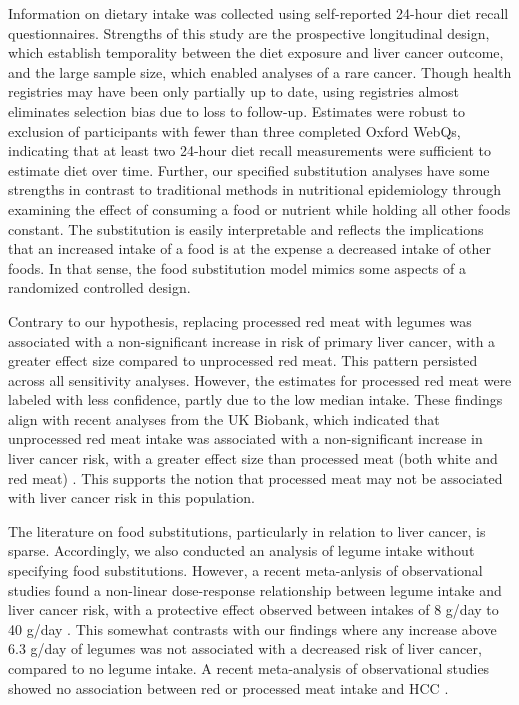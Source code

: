 \documentclass[nutrients,article,submit,moreauthors,pdftex]{Definitions/mdpi}
\begin{document}
Information on dietary intake was collected using self-reported 24-hour
diet recall questionnaires. Strengths of this study are the prospective
longitudinal design, which establish temporality between the diet
exposure and liver cancer outcome, and the large sample size, which
enabled analyses of a rare cancer. Though health registries may have
been only partially up to date, using registries almost eliminates
selection bias due to loss to follow-up. Estimates were robust to
exclusion of participants with fewer than three completed Oxford WebQs,
indicating that at least two 24-hour diet recall measurements were
sufficient to estimate diet over time. Further, our specified
substitution analyses have some strengths in contrast to traditional
methods in nutritional epidemiology through examining the effect of
consuming a food or nutrient while holding all other foods constant. The
substitution is easily interpretable and reflects the implications that
an increased intake of a food is at the expense a decreased intake of
other foods. In that sense, the food substitution model mimics some
aspects of a randomized controlled design.

Contrary to our hypothesis, replacing processed red meat with legumes
was associated with a non-significant increase in risk of primary liver
cancer, with a greater effect size compared to unprocessed red meat.
This pattern persisted across all sensitivity analyses. However, the
estimates for processed red meat were labeled with less confidence,
partly due to the low median intake. These findings align with recent
analyses from the UK Biobank, which indicated that unprocessed red meat
intake was associated with a non-significant increase in liver cancer
risk, with a greater effect size than processed meat (both white and red
meat) \citep{Knuppel2020}. This supports the notion that processed meat
may not be associated with liver cancer risk in this population.

The literature on food substitutions, particularly in relation to liver
cancer, is sparse. Accordingly, we also conducted an analysis of legume
intake without specifying food substitutions. However, a recent
meta-anlysis of observational studies found a non-linear dose-response
relationship between legume intake and liver cancer risk, with a
protective effect observed between intakes of 8 g/day to 40 g/day
\citep{liu2023a}. This somewhat contrasts with our findings where any
increase above 6.3 g/day of legumes was not associated with a decreased
risk of liver cancer, compared to no legume intake. A recent
meta-analysis of observational studies showed no association between red
or processed meat intake and HCC \citep{Di2023}.
\end{document}
